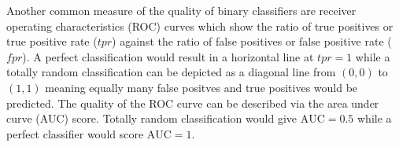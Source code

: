 Another common measure of the quality of binary classifiers are receiver operating characteristics (ROC) curves which show the ratio of true positives or true positive rate ($tpr$) against the ratio of false positives or false positive rate ($fpr$).
A perfect classification would result in a horizontal line at $tpr = 1$ while a totally random classification can be depicted as a diagonal line from $(0,0)$ to $(1,1)$ meaning equally many false positves and true positives would be predicted. The quality of the ROC curve can be described via the area under curve (AUC) score.
Totally random classification would give $\mathrm{AUC} = 0.5$ while a perfect classifier would score $\mathrm{AUC} = 1$.

